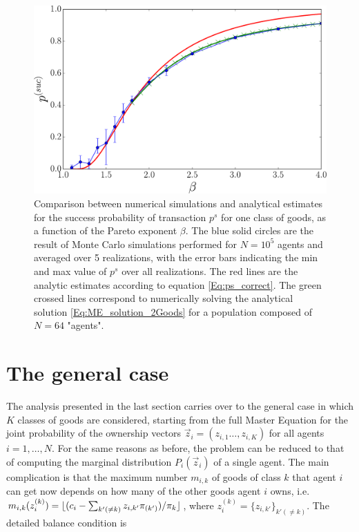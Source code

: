 \begin{figure}
\includegraphics[width=\textwidth]{figs_ineq/fig_K=1_e=1p2_g=undef_ps_prediction_unadj.pdf}
\caption{Comparison between numerical simulations and analytical estimates for the success probability of transaction $p^s$ for one class of goods, as a function of the Pareto exponent $\beta$. The blue solid circles are the result  of Monte Carlo simulations performed for $N=10^5$ agents and averaged over 5 realizations, with the error bars indicating the min and max value of $p^s$ over all realizations. The red lines are the analytic estimates  according to equation \eqref{Eq:ps_correct}. The green crossed lines correspond to numerically solving the analytical solution  \eqref{Eq:ME_solution_2Goods} for a population composed of $N=64$ "agents".
}
\label{Fig:ps_one_good}
\end{figure}


\section{The general case}

The analysis presented in the last section carries over to the general case in which $K$ classes of goods are considered, starting from the full Master Equation for the joint probability of the ownership vectors $\vec z_i=(z_{i,1}\ldots, z_{i,K})$ for all agents $i=1,\ldots,N$. For the same reasons as before, the problem can be reduced to that of computing the marginal distribution $P_i(\vec z_i)$ of a single agent. The main complication is that the maximum number $m_{i,k}$ of goods of class $k$ that agent $i$ can get now depends on how many of the other goods agent $i$ owns, i.e. $m_{i,k}(z^{(k)}_i)=\lfloor(c_i-\sum_{k'(\neq k)} z_{i,k'} \pi_{(k')})/\pi_{{k}}\rfloor$, where $z^{(k)}_i=\{z_{i,{k'}}\}_{k'(\neq k)}$. The detailed balance condition is


